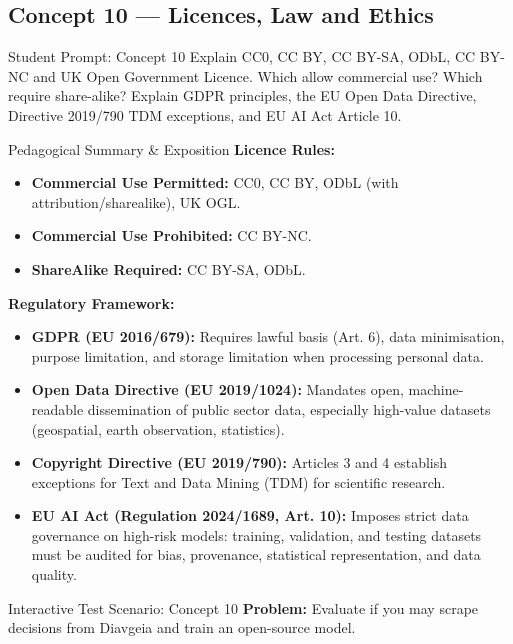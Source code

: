 \documentclass[11pt,a4paper]{article}
\begin{document}
\subsection{Concept 10 --- Licences, Law and Ethics}
\begin{promptbox}{Student Prompt: Concept 10}
Explain CC0, CC BY, CC BY-SA, ODbL, CC BY-NC and UK Open Government Licence. Which allow commercial use? Which require share-alike? Explain GDPR principles, the EU Open Data Directive, Directive 2019/790 TDM exceptions, and EU AI Act Article 10.
\end{promptbox}

\begin{evalbox}{Pedagogical Summary \& Exposition}
\textbf{Licence Rules:}
\begin{itemize}
    \item \textbf{Commercial Use Permitted:} CC0, CC BY, ODbL (with attribution/sharealike), UK OGL.
    \item \textbf{Commercial Use Prohibited:} CC BY-NC.
    \item \textbf{ShareAlike Required:} CC BY-SA, ODbL.
\end{itemize}
\textbf{Regulatory Framework:}
\begin{itemize}
    \item \textbf{GDPR (EU 2016/679):} Requires lawful basis (Art. 6), data minimisation, purpose limitation, and storage limitation when processing personal data.
    \item \textbf{Open Data Directive (EU 2019/1024):} Mandates open, machine-readable dissemination of public sector data, especially high-value datasets (geospatial, earth observation, statistics).
    \item \textbf{Copyright Directive (EU 2019/790):} Articles 3 and 4 establish exceptions for Text and Data Mining (TDM) for scientific research.
    \item \textbf{EU AI Act (Regulation 2024/1689, Art. 10):} Imposes strict data governance on high-risk models: training, validation, and testing datasets must be audited for bias, provenance, statistical representation, and data quality.
\end{itemize}
\end{evalbox}

\begin{testbox}{Interactive Test Scenario: Concept 10}
\textbf{Problem:} Evaluate if you may scrape decisions from Diavgeia and train an open-source model.
\end{testbox}
\end{document}
